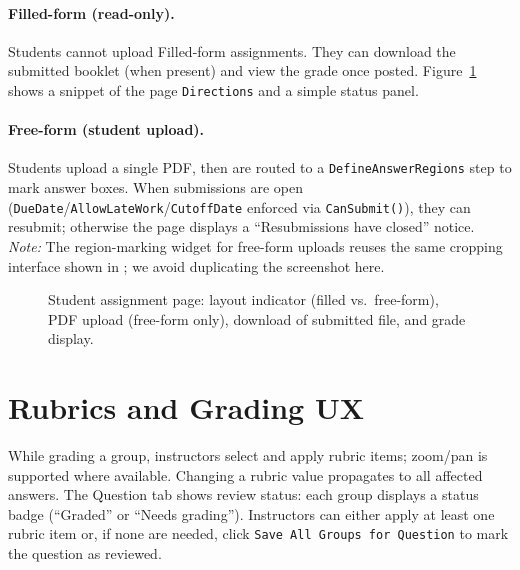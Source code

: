 \documentclass[ms,twoside,print]{nuthesis}
\begin{document}
\paragraph{Filled-form (read-only).}
Students cannot upload Filled-form assignments. They can download the submitted booklet (when present) and view the grade once posted. Figure~\ref{fig:ui-student} shows a snippet of the page \texttt{Directions} and a simple status panel.

\paragraph{Free-form (student upload).}
Students upload a single PDF, then are routed to a \texttt{DefineAnswerRegions} step to mark answer boxes. When submissions are open (\texttt{DueDate}/\texttt{AllowLateWork}/\texttt{CutoffDate} enforced via \texttt{CanSubmit()}), they can resubmit; otherwise the page displays a \enquote{Resubmissions have closed} notice. \emph{Note:} The region-marking widget for free-form uploads reuses the same cropping interface shown in ; we avoid duplicating the screenshot here.

\begin{figure}[htb]
  \centering
  \caption{Student assignment page: layout indicator (filled vs.\ free-form), PDF upload (free-form only), download of submitted file, and grade display.}
  \label{fig:ui-student}
\end{figure}

\section{Rubrics and Grading UX}
While grading a group, instructors select and apply rubric items; zoom/pan is supported where available. Changing a rubric value propagates to all affected answers. The Question tab shows review status: each group displays a status badge (\enquote{Graded} or \enquote{Needs grading}). Instructors can either apply at least one rubric item or, if none are needed, click \texttt{Save All Groups for Question} to mark the question as reviewed.
\end{document}
